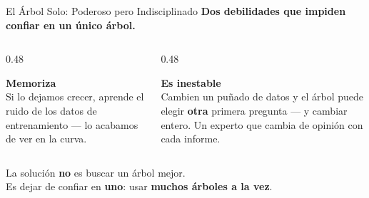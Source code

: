 \documentclass[aspectratio=169, 11pt]{beamer}
\begin{document}
\begin{frame}[shrink=8]{El Árbol Solo: Poderoso pero Indisciplinado}
  \vspace{-4pt}
  {\small\color{arcaDark}\bfseries
    Dos debilidades que impiden confiar en un único árbol.}

  \vspace{8pt}
  \begin{columns}[T]
    \begin{column}{0.48\textwidth}
      \begin{tcolorbox}[colback=arcaGray, colframe=arcaRed, boxrule=0pt, leftrule=3pt,
        arc=3pt, left=6pt, right=6pt, top=5pt, bottom=5pt]
        {\scriptsize\color{arcaRed}\bfseries\faExclamationTriangle\hspace{4pt}Memoriza}\\[4pt]
        {\scriptsize\color{textMuted}
          Si lo dejamos crecer, aprende el ruido de los
          datos de entrenamiento --- lo acabamos de ver
          en la curva.}
      \end{tcolorbox}
    \end{column}
    \begin{column}{0.48\textwidth}
      \begin{tcolorbox}[colback=arcaGray, colframe=codeOrange, boxrule=0pt, leftrule=3pt,
        arc=3pt, left=6pt, right=6pt, top=5pt, bottom=5pt]
        {\scriptsize\color{codeOrange}\bfseries\faExclamationTriangle\hspace{4pt}Es inestable}\\[4pt]
        {\scriptsize\color{textMuted}
          Cambien un puñado de datos y el árbol puede
          elegir \textbf{otra} primera pregunta --- y cambiar
          entero. Un experto que cambia de opinión
          con cada informe.}
      \end{tcolorbox}
    \end{column}
  \end{columns}

  \vspace{12pt}
  \centering
  \begin{tcolorbox}[colback=arcaGray, colframe=codeGreen, boxrule=0pt, leftrule=3pt,
    arc=3pt, left=8pt, right=8pt, top=6pt, bottom=6pt, width=0.85\textwidth]
    {\footnotesize\color{arcaDark}
      La solución \textbf{no} es buscar un árbol mejor.\\[2pt]
      Es dejar de confiar en \textbf{uno}: usar \textbf{muchos árboles a la vez}.}
  \end{tcolorbox}
\end{frame}
\end{document}
